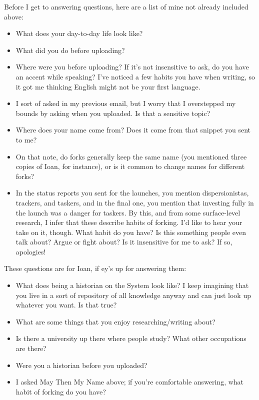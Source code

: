 \noindent Before I get to answering questions, here are a list of mine not already included above:

\begin{itemize}
\tightlist
\item
  What does your day-to-day life look like?
\item
  What did you do before uploading?
\item
  Where were you before uploading? If it's not insensitive to ask, do you have an accent while speaking? I've noticed a few habits you have when writing, so it got me thinking English might not be your first language.
\item
  I sort of asked in my previous email, but I worry that I overstepped my bounds by asking when you uploaded. Is that a sensitive topic?
\item
  Where does your name come from? Does it come from that snippet you sent to me?
\item
  On that note, do forks generally keep the same name (you mentioned three copies of Ioan, for instance), or is it common to change names for different forks?
\item
  In the status reports you sent for the launches, you mention dispersionistas, trackers, and taskers, and in the final one, you mention that investing fully in the launch was a danger for taskers. By this, and from some surface-level research, I infer that these describe habits of forking. I'd like to hear your take on it, though. What habit do you have? Is this something people even talk about? Argue or fight about? Is it insensitive for me to ask? If so, apologies!
\end{itemize}

\noindent These questions are for Ioan, if ey's up for answering them:

\begin{itemize}
\tightlist
\item
  What does being a historian on the System look like? I keep imagining that you live in a sort of repository of all knowledge anyway and can just look up whatever you want. Is that true?
\item
  What are some things that you enjoy researching/writing about?
\item
  Is there a university up there where people study? What other occupations are there?
\item
  Were you a historian before you uploaded?
\item
  I asked May Then My Name above; if you're comfortable answering, what habit of forking do you have?
\end{itemize}

